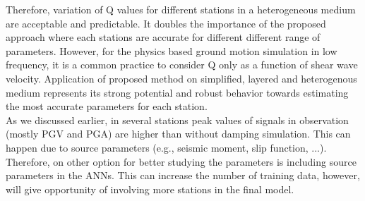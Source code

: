 Therefore, variation of Q values for different stations in a heterogeneous medium are acceptable and predictable. It doubles the importance of the proposed approach where each stations are accurate for different different range of parameters. However, for the physics based ground motion simulation in low frequency, it is a common practice to consider Q only as a function of shear wave velocity. Application of proposed method on simplified, layered and heterogenous medium represents its strong potential and robust behavior towards estimating the most accurate parameters for each station.\\

As we discussed earlier, in several stations peak values of signals in observation (mostly PGV and PGA) are higher than without damping simulation. This can happen due to source parameters (e.g., seismic moment, slip function, ...). Therefore, on other option for better studying the parameters is including source parameters in the ANNs. This can increase the number of training data, however, will give opportunity of involving more stations in the final model.

 


